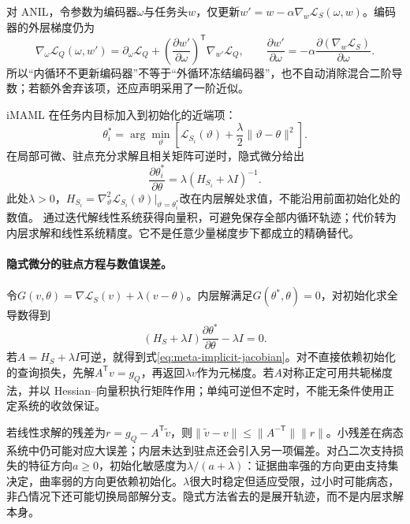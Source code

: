 对 ANIL，令参数为编码器$\omega$与任务头$w$，仅更新$w'=w-\alpha\nabla_w\mathcal L_S(\omega,w)$。编码器的外层梯度仍为
\begin{equation}
 \nabla_\omega\mathcal L_Q(\omega,w')
 =\partial_\omega\mathcal L_Q
 +\left(\frac{\partial w'}{\partial\omega}\right)^{\mathsf T}
 \nabla_{w'}\mathcal L_Q,\qquad
 \frac{\partial w'}{\partial\omega}
 =-\alpha\frac{\partial(\nabla_w\mathcal L_S)}{\partial\omega}.
\end{equation}
所以“内循环不更新编码器”不等于“外循环冻结编码器”，也不自动消除混合二阶导数；若额外舍弃该项，还应声明采用了一阶近似。

iMAML 在任务内目标加入到初始化的近端项\cite{rajeswaran2019imaml}：
\begin{equation}
 \theta_i^*=\arg\min_\vartheta\left[\mathcal L_{S_i}(\vartheta)
 +\frac\lambda2\|\vartheta-\theta\|^2\right].
\end{equation}
在局部可微、驻点充分求解且相关矩阵可逆时，隐式微分给出
\begin{equation}
 \frac{\partial\theta_i^*}{\partial\theta}
 =\lambda(H_{S_i}+\lambda I)^{-1}.\label{eq:meta-implicit-jacobian}
\end{equation}
此处$\lambda>0$，$H_{S_i}=\nabla_\vartheta^2\mathcal L_{S_i}(\vartheta)|_{\vartheta=\theta_i^*}$改在内层解处求值，不能沿用前面初始化处的数值。
通过迭代解线性系统获得向量积，可避免保存全部内循环轨迹；代价转为内层求解和线性系统精度。它不是任意少量梯度步下都成立的精确替代。

\paragraph{隐式微分的驻点方程与数值误差。}
令$G(v,\theta)=\nabla\mathcal L_S(v)+\lambda(v-\theta)$。内层解满足$G(\theta^*,\theta)=0$，对初始化求全导数得到
\begin{equation}
 (H_S+\lambda I)\frac{\partial\theta^*}{\partial\theta}
 -\lambda I=0.
\end{equation}
若$A=H_S+\lambda I$可逆，就得到式\eqref{eq:meta-implicit-jacobian}。对不直接依赖初始化的查询损失，先解$A^{\mathsf T}v=g_Q$，再返回$\lambda v$作为元梯度。若$A$对称正定可用共轭梯度法，并以 Hessian--向量积执行矩阵作用；单纯可逆但不定时，不能无条件使用正定系统的收敛保证。

若线性求解的残差为$r=g_Q-A^{\mathsf T}\widetilde v$，则$\|\widetilde v-v\|\leq\|A^{-\mathsf T}\|\|r\|$。小残差在病态系统中仍可能对应大误差；内层未达到驻点还会引入另一项偏差。对凸二次支持损失的特征方向$a\geq0$，初始化敏感度为$\lambda/(a+\lambda)$：证据曲率强的方向更由支持集决定，曲率弱的方向更依赖初始化。$\lambda$很大时稳定但适应受限，过小时可能病态，非凸情况下还可能切换局部解分支。隐式方法省去的是展开轨迹，而不是内层求解本身。

